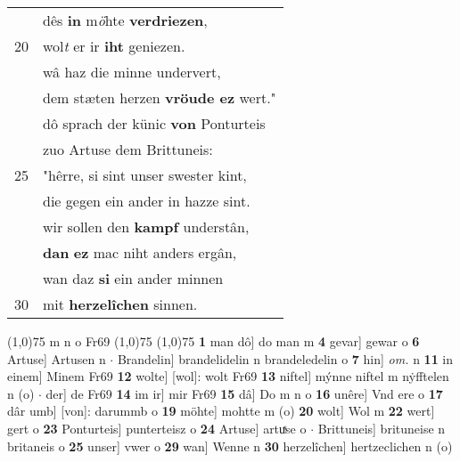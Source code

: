 \documentclass[8pt,a4paper,notitlepage]{article}
\begin{document}
\begin{table}[ht]
\begin{minipage}[t]{0.5\linewidth}
\begin{tabular}{rl}
 & dês \textbf{in} m\textit{ö}hte \textbf{verdriezen},\\ 
20 & wol\textit{t} er ir \textbf{iht} geniezen.\\ 
 & wâ haz die minne undervert,\\ 
 & dem stæten herzen \textbf{vröude ez} wert."\\ 
 & dô sprach der künic \textbf{von} Ponturteis\\ 
 & zuo Artuse dem Brittuneis:\\ 
25 & "hêrre, si sint unser swester kint,\\ 
 & die gegen ein ander in hazze sint.\\ 
 & wir sollen den \textbf{kampf} understân,\\ 
 & \textbf{dan} \textbf{ez} mac niht anders ergân,\\ 
 & wan daz \textbf{si} ein ander minnen\\ 
30 & mit \textbf{herzelîchen} sinnen.\\ 
\end{tabular}
\scriptsize
\line(1,0){75} \newline
m n o Fr69 \newline
\line(1,0){75} \newline
\newline
\line(1,0){75} \newline
\textbf{1} man dô] do man m \textbf{4} gevar] gewar o \textbf{6} Artuse] Artusen n  $\cdot$ Brandelin] brandelidelin n brandeledelin o \textbf{7} hin] \textit{om.} n \textbf{11} in einem] Minem Fr69 \textbf{12} wolte] [wol]: wolt Fr69 \textbf{13} niftel] mýnne niftel m nẏfftelen n (o)  $\cdot$ der] de Fr69 \textbf{14} im ir] mir Fr69 \textbf{15} dâ] Do m n o \textbf{16} unêre] Vnd ere o \textbf{17} dâr umb] [von]: darummb o \textbf{19} möhte] mohtte m (o) \textbf{20} wolt] Wol m \textbf{22} wert] gert o \textbf{23} Ponturteis] punterteisz o \textbf{24} Artuse] artuͯse o  $\cdot$ Brittuneis] brituneise n britaneis o \textbf{25} unser] vwer o \textbf{29} wan] Wenne n \textbf{30} herzelîchen] hertzeclichen n (o) \newline
\end{minipage}
\end{table}
\newpage
\end{document}
